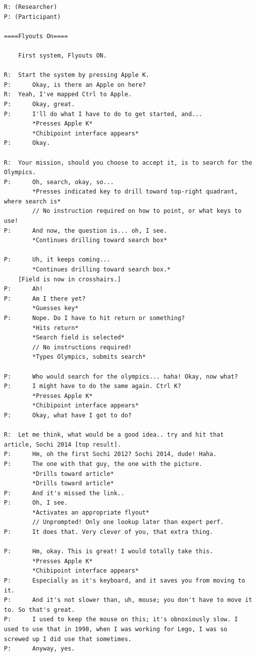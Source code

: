 \documentclass[11pt,openright,a4paper]{report}
\begin{document}
\begin{lstlisting}[caption={Transcript of Usability Study}, label={lst:usabilityTrans}, style=basic, language=custom, flexiblecolumns=true]
R: (Researcher)
P: (Participant)

====Flyouts On====

	First system, Flyouts ON.

R:	Start the system by pressing Apple K.
P:		Okay, is there an Apple on here?
R:	Yeah, I've mapped Ctrl to Apple.
P:		Okay, great.
P:		I'll do what I have to do to get started, and...
		*Presses Apple K*
		*Chibipoint interface appears*
P:		Okay.

R:	Your mission, should you choose to accept it, is to search for the Olympics.
P:		Oh, search, okay, so...
		*Presses indicated key to drill toward top-right quadrant, where search is*
		// No instruction required on how to point, or what keys to use!
P:		And now, the question is... oh, I see.
		*Continues drilling toward search box*

P:		Uh, it keeps coming...
		*Continues drilling toward search box.*
	[Field is now in crosshairs.]
P:		Ah!
P:		Am I there yet?
		*Guesses key*
P:		Nope. Do I have to hit return or something?
		*Hits return*
		*Search field is selected*
		// No instructions required!
		*Types Olympics, submits search*

P:		Who would search for the olympics... haha! Okay, now what?
P:		I might have to do the same again. Ctrl K?
		*Presses Apple K*
		*Chibipoint interface appears*
P:		Okay, what have I got to do?

R:	Let me think, what would be a good idea.. try and hit that article, Sochi 2014 [top result].
P:		Hm, oh the first Sochi 2012? Sochi 2014, dude! Haha.
P:		The one with that guy, the one with the picture.
		*Drills toward article*
		*Drills toward article*
P:		And it's missed the link..
P:		Oh, I see.
		*Activates an appropriate flyout*
		// Unprompted! Only one lookup later than expert perf.
P:		It does that. Very clever of you, that extra thing.

P:		Hm, okay. This is great! I would totally take this.
		*Presses Apple K*
		*Chibipoint interface appears*
P:		Especially as it's keyboard, and it saves you from moving to it.
P:		And it's not slower than, uh, mouse; you don't have to move it to. So that's great.
P:		I used to keep the mouse on this; it's obnoxiously slow. I used to use that in 1998, when I was working for Lego, I was so screwed up I did use that sometimes.
P:		Anyway, yes.


\end{lstlisting}
\end{document}
